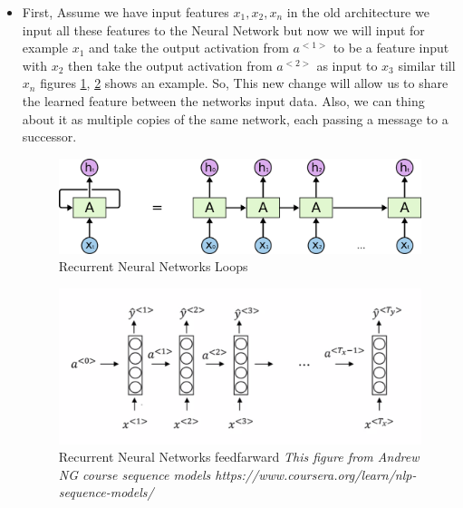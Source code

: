 \begin{itemize}
\item First, Assume we have input features $x_1, x_2, x_n$ in the old architecture we input all these features to the Neural Network but now we will input for example $x_1$ and take the output activation from $a^{<1>}$ to be a feature input with $x_2$ then take the output activation from $a^{<2>}$ as input to $x_3$ similar till $x_n$ figures \ref{fig:RNN-rolled-loop.png}, \ref{fig:andew_ng_feedfarward} shows an example. So, This new change will allow us to share the learned feature between the networks input data. Also, we can thing about it as multiple copies of the same network, each passing a message to a successor\cite{colah}.

   \begin{figure}[h!] \includegraphics[width=\linewidth]{./Figures/Ch_2_Background/RNN-unrolled.png}
  \caption{Recurrent Neural Networks Loops\cite{colah}}
  \label{fig:RNN-rolled-loop.png}
\end{figure}

\begin{figure}[h!] \includegraphics[width=\linewidth]{./Figures/Ch_2_Background/andew_ng_feedfarward.png}
  \caption{Recurrent Neural Networks feedfarward \textit{ This figure from Andrew NG course sequence models https://www.coursera.org/learn/nlp-sequence-models/ }}
  \label{fig:andew_ng_feedfarward}
\end{figure}



\end{itemize}
